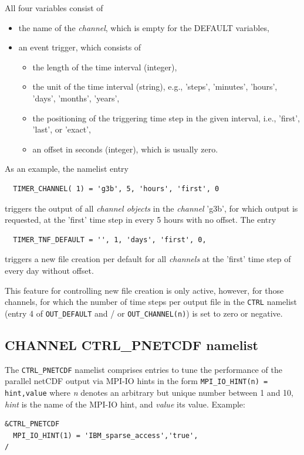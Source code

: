 \documentclass[twoside]{article}
\begin{document}
All four variables consist of
\begin{itemize}
 \item the name of the {\it channel}, which is empty for the
       DEFAULT variables,
 \item an event trigger, which consists of
       \begin{itemize}
        \item the length of the time interval (integer),
        \item the unit of the time interval (string), e.g.,
              'steps', 'minutes', 'hours', 'days', 'months', 'years',
        \item the positioning of the triggering time step in the given
              interval, i.e., 'first', 'last', or 'exact',
        \item an offset in seconds (integer), which is usually zero.
       \end{itemize}
\end{itemize}
%
As an example, the namelist entry
\begin{verbatim}
  TIMER_CHANNEL( 1) = 'g3b', 5, 'hours', 'first', 0
\end{verbatim}
triggers the output of all {\it channel objects} in the {\it channel}
'g3b', for which output is requested, at the 'first' time step in every
5 hours with no offset.
%
The entry
\begin{verbatim}
  TIMER_TNF_DEFAULT = '', 1, 'days', 'first', 0,
\end{verbatim}
triggers a new file creation per default for all {\it channels} at the
'first' time step of every day without offset.

This feature for controlling new file creation is only active, however,
for those channels, for which the
number of time steps per output file in the {\tt CTRL} namelist
(entry 4 of {\tt OUT\_DEFAULT} and / or {\tt OUT\_CHANNEL(n)}) is set to zero
or negative.

\subsection{CHANNEL CTRL\_PNETCDF namelist}
\label{sec:channelCTRLPNETCDF}
The {\tt CTRL\_PNETCDF} namelist comprises entries to tune the
performance of the parallel netCDF output via
MPI-IO hints in the form {\tt MPI\_IO\_HINT(n) = hint,value}
where {\it n} denotes an arbitrary but unique number between 1 and 10,
{\it hint} is the name of the MPI-IO hint, and {\it value} its value.
Example:
\begin{verbatim}
&CTRL_PNETCDF
  MPI_IO_HINT(1) = 'IBM_sparse_access','true',
/
\end{verbatim}
\end{document}
